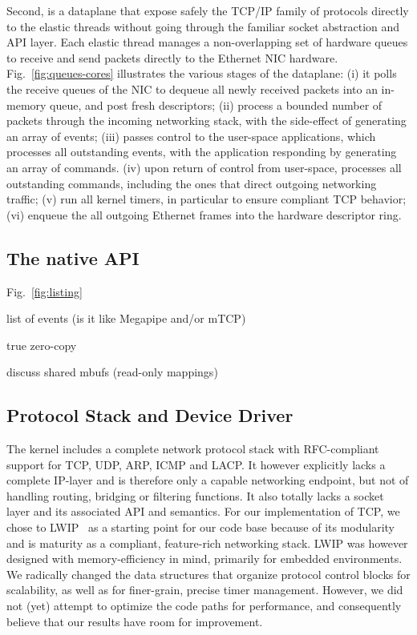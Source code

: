 Second, \ix is a dataplane that expose safely the TCP/IP family of
protocols directly to the elastic threads without going through the
familiar socket abstraction and API layer.  Each elastic thread
manages a non-overlapping set of hardware queues to receive and send
packets directly to the Ethernet NIC hardware.
Fig.~\ref{fig:queues-cores} illustrates the various stages of the \ix
dataplane: (i) it polls the receive queues of the NIC to dequeue all
newly received packets into an in-memory queue, and post fresh
descriptors; (ii) process a bounded number of packets through the
incoming networking stack, with the side-effect of generating an
array of events; (iii) passes control to the user-space applications,
which processes all outstanding events, with the application
responding by generating an array of \ix commands.  (iv) upon return
of control from user-space, \ix processes all outstanding commands,
including the ones that direct outgoing networking traffic; (v) run
all kernel timers, in particular to ensure compliant TCP behavior;
(vi) enqueue the all outgoing Ethernet frames into the hardware
descriptor ring.


\subsection{The \ix native API}
\label{sec:impl:api}



\todo Fig.~\ref{fig:listing} 


\todo list of events (is it like Megapipe and/or mTCP)

\todo  true zero-copy

\todo discuss shared mbufs (read-only mappings)

\subsection{Protocol Stack and Device Driver}

The \ix kernel includes a complete network protocol stack with
RFC-compliant support for TCP, UDP, ARP, ICMP and LACP.  It however
explicitly lacks a complete IP-layer and is therefore only a capable
networking endpoint, but not of handling routing, bridging or
filtering functions.  It also totally lacks a socket layer and its
associated API and semantics.  For our implementation of TCP, we chose
to LWIP~\cite{} as a starting point for our code base because of its
modularity and is maturity as a compliant, feature-rich networking
stack.  LWIP was however designed with memory-efficiency in mind,
primarily for embedded environments.  We radically changed the data
structures that organize protocol control blocks for scalability, as
well as for finer-grain, precise timer management.  However, we did
not (yet) attempt to optimize the code paths for performance, and
consequently believe that our results have room for improvement.

